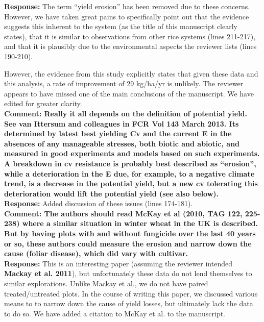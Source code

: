 \documentclass{article} \usepackage[margin=1in]{geometry}
\begin{document}
\textbf{Response:} The term ``yield erosion'' has been removed due to
these concerns. However, we have taken great pains to specifically
point out that the evidence suggests this inherent to the system
(as the title of this manuscript clearly states), that it is similar
to observations from other rice systems (lines 211-217), and that it is plausibly
due to the environmental aspects the reviewer lists (lines 190-210).

However, the evidence from this study explicitly states that given
these data and this analysis, a rate of improvement of 29 kg/ha/yr
is unlikely. The reviewer appears to have missed one of the main
conclusions of the manuscript. We have edited for greater clarity. \\

\textbf{Comment: Really it all depends on the definition of potential yield. See van
  Ittersum and colleagues in FCR Vol 143 March 2013. Its determined by
  latest best yielding Cv and the current E in the absences of any
  manageable stresses, both biotic and abiotic, and measured in good
  experiments and models based on such experiments. A breakdown in cv
  resistance is probably best described as “erosion”, while a
  deterioration in the E due, for example, to a negative climate trend,
  is a decrease in the potential yield, but a new cv tolerating this
  deterioration would lift the potential yield (see also below).}\\

\textbf{Response:} Added discussion of these issues (lines 174-181). \\

\textbf{Comment: The authors should read McKay et al (2010, TAG 122, 225-238) where a
  similar situation in winter wheat in the UK is described. But by
  having plots with and without fungicide over the last 40 years or so,
  these authors could measure the erosion and narrow down the cause
  (foliar disease), which did vary with cultivar.}\\

\textbf{Response:} This is an interesting paper (assuming the reviewer
intended \textbf{Mackay et al. 2011}), but unfortunately
these data do not lend themselves to similar explorations. Unlike
Mackay et al., we do not have paired treated/untreated plots. In the
course of writing this paper, we discussed various means to to narrow down the
cause of yield losses, but ultimately lack the data to do so. We have
added a citation to McKay et al. to the manuscript.\\
\end{document}
